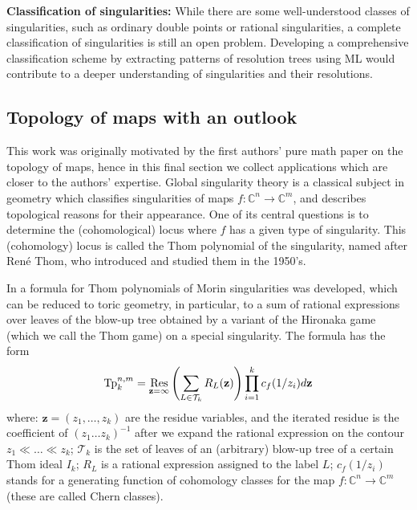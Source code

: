 \documentclass{article}
\theoremstyle{plain}
\newtheorem{theorem}{Theorem}[section]
\theoremstyle{definition}
\theoremstyle{remark}
\newcommand{\CC}{{\mathbb{C}}}
\begin{document}
\textbf{Classification of singularities:} While there are some well-understood classes of singularities, such as ordinary double points or rational singularities, a complete classification of singularities is still an open problem. Developing a comprehensive classification scheme by extracting patterns of resolution trees using ML would contribute to a deeper understanding of singularities and their resolutions.


\subsection{Topology of maps with an outlook}

This work was originally motivated by the first authors' pure math paper \cite{bercziThom} on the topology of maps, hence in this final section we collect applications which are closer to the authors' expertise. 
Global singularity theory is a classical subject in geometry which classifies singularities of maps $f:\CC^n \to \CC^m$, and 
describes topological reasons for their appearance. One of its central questions is to determine the (cohomological) locus where $f$ has a given type of singularity. This (cohomology) locus is called the Thom polynomial of the singularity, named after Ren\'e Thom, who introduced and studied them in the 1950's.

In \cite{bsz} a formula for Thom polynomials of Morin singularities was developed, which can be reduced to toric geometry, in particular, to a sum of rational expressions over leaves of the blow-up tree obtained by a variant of the Hironaka game (which we call the Thom game) on a special singularity. The formula has the form 
\[\mathrm{Tp}_k^{n,m}=\operatornamewithlimits{\mathrm{Res}}\limits_{\mathbf{z}=\infty}\left(\sum_{L \in \mathcal{T}_k} R_{L}(\mathbf{z})\right) \prod_{i=1}^k c_f(1/z_i)d\mathbf{z}\]
where: $\mathbf{z}=(z_1,\ldots, z_k)$ are the residue variables, and the iterated residue is the coefficient of $(z_1 \ldots z_k)^{-1}$ after we expand the rational expression on the contour $z_1 \ll \ldots \ll z_k$;  $\mathcal{T}_k$ is the set of leaves of an (arbitrary) blow-up tree of a certain Thom ideal $I_k$; $R_L$ is a rational expression assigned to the label $L$; $c_f(1/z_i)$ stands for a generating function of cohomology classes for the map $f:\CC^n \to \CC^m$ (these are called Chern classes).
\end{document}
